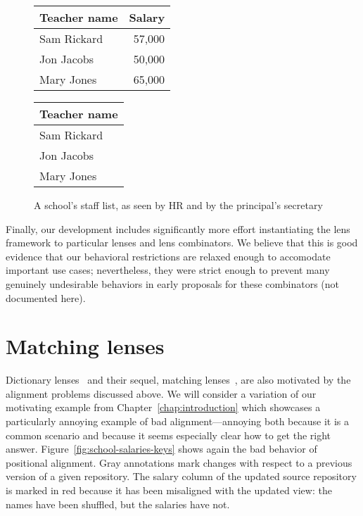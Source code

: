 \begin{figure}
    \begin{minipage}{0.5\linewidth}
        \centering
        \begin{tabular}{lr}
            Teacher name & Salary \\
            \hline
            Sam Rickard & 57,000 \\
            Jon Jacobs & 50,000 \\
            Mary Jones & 65,000 \\
        \end{tabular}
        \label{fig:school-salaries-delins-hr}
    \end{minipage}%
    \begin{minipage}{0.5\linewidth}
        \centering
        \begin{tabular}{l}
            Teacher name \\
            \hline
            Sam Rickard \\
            Jon Jacobs \\
            Mary Jones \\
        \end{tabular}
        \label{fig:school-salaries-delins-sec-pre}
    \end{minipage}%
    \caption{A school's staff list, as seen by HR and by the principal's secretary}
    \label{fig:school-salaries-delins}
\end{figure}

Finally, our development includes significantly more effort instantiating
the lens framework to particular lenses and lens combinators. We believe
that this is good evidence that our behavioral restrictions are relaxed
enough to accomodate important use cases; nevertheless, they were strict
enough to prevent many genuinely undesirable behaviors in early proposals
for these combinators (not documented here).


\section{Matching lenses}
\label{sec:matching}
Dictionary lenses~\cite{Boomerang07} and their sequel, matching
lenses~\cite{Matching10}, are also motivated by the alignment problems
discussed above. We will consider a variation of our motivating example from
Chapter~\ref{chap:introduction} which showcases a particularly annoying
example of bad alignment---annoying both because it is a common scenario and
because it seems especially clear how to get the right answer.
Figure~\ref{fig:school-salaries-keys} shows again the bad behavior of
positional alignment. Gray annotations mark changes with respect to a
previous version of a given repository. The salary column of the updated
source repository is marked in red because it has been misaligned with the
updated view: the names have been shuffled, but the salaries have not.

